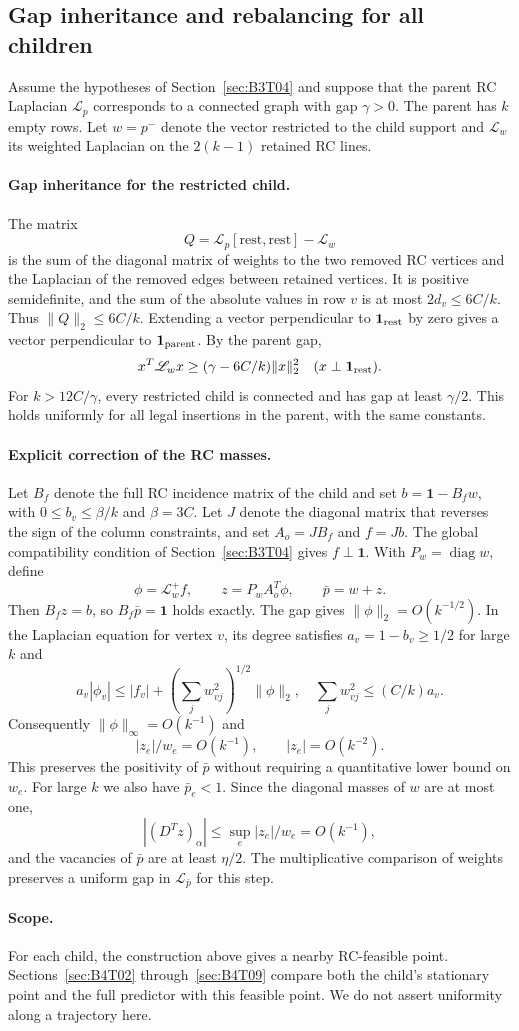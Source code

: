 \subsection{Gap inheritance and rebalancing for all children}\label{sec:B3T07}
Assume the hypotheses of Section~\ref{sec:B3T04} and suppose that the parent RC Laplacian $\mathscr L_p$
corresponds to a connected graph with gap $\gamma>0$. The parent has $k$ empty rows.
Let $w=p^-$ denote the vector restricted to the child support and $\mathscr L_w$ its weighted Laplacian on
the $2(k-1)$ retained RC lines.

\paragraph{Gap inheritance for the restricted child.}
The matrix
\[
 Q=\mathscr L_p[\mathrm{rest},\mathrm{rest}]-\mathscr L_w
\]
is the sum of the diagonal matrix of weights to the two removed RC vertices and the Laplacian of the removed
edges between retained vertices. It is positive semidefinite, and the sum of the absolute values in row $v$
is at most $2d_v\le6C/k$. Thus $\|Q\|_2\le6C/k$.
Extending a vector perpendicular to $\mathbf1_{\rm rest}$ by zero gives a vector perpendicular to
$\mathbf1_{\rm parent}$.
By the parent gap,
\[
 x^T\mathscr L_wx\ge(\gamma-6C/k)\|x\|_2^2
 \quad(x\perp\mathbf1_{\rm rest}).
\]
For $k>12C/\gamma$, every restricted child is connected and has gap at least $\gamma/2$. This holds
uniformly for all legal insertions in the parent, with the same constants.

\paragraph{Explicit correction of the RC masses.}
Let $B_f$ denote the full RC incidence matrix of the child and set $b=\mathbf1-B_fw$, with $0\le
b_v\le\beta/k$ and $\beta=3C$.
Let $J$ denote the diagonal matrix that reverses the sign of the column constraints, and set $A_o=JB_f$ and
$f=Jb$.
The global compatibility condition of Section~\ref{sec:B3T04} gives $f\perp\mathbf1$.
With $P_w=\operatorname{diag}w$, define
\[
 \phi=\mathscr L_w^+f,\qquad z=P_wA_o^T\phi,
 \qquad \bar p=w+z.
\]
Then $B_fz=b$, so $B_f\bar p=\mathbf1$ holds exactly.
The gap gives $\|\phi\|_2=O(k^{-1/2})$. In the Laplacian equation for vertex $v$, its degree satisfies
$a_v=1-b_v\ge1/2$ for large $k$ and
\[
 a_v|\phi_v|\le |f_v|+
 \left(\sum_jw_{vj}^2\right)^{1/2}\|\phi\|_2,
 \quad \sum_jw_{vj}^2\le(C/k)a_v.
\]
Consequently $\|\phi\|_\infty=O(k^{-1})$ and
\[
 \boxed{|z_e|/w_e=O(k^{-1}),\qquad |z_e|=O(k^{-2}).}
\]
This preserves the positivity of $\bar p$ without requiring a quantitative lower bound on $w_e$. For large
$k$ we also have $\bar p_e<1$.
Since the diagonal masses of $w$ are at most one,
\[
 |(D^Tz)_\alpha|\le\sup_e|z_e|/w_e=O(k^{-1}),
\]
and the vacancies of $\bar p$ are at least $\eta/2$.
The multiplicative comparison of weights preserves a uniform gap in $\mathscr L_{\bar p}$ for this step.

\paragraph{Scope.}
For each child, the construction above gives a nearby RC-feasible point.
Sections~\ref{sec:B4T02} through~\ref{sec:B4T09} compare both the child's stationary point and the full
predictor with this feasible point. We do not assert uniformity along a trajectory here.
